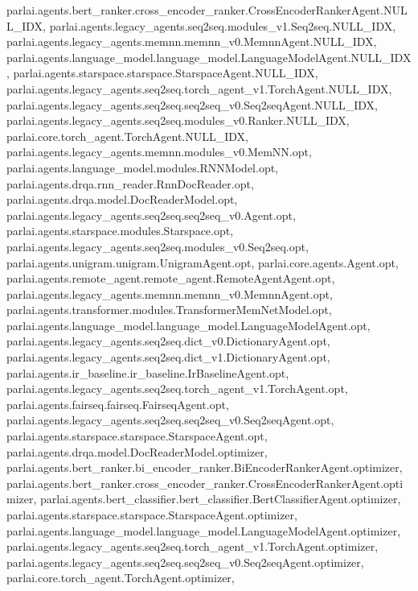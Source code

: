 parlai.\+agents.\+bert\+\_\+ranker.\+cross\+\_\+encoder\+\_\+ranker.\+Cross\+Encoder\+Ranker\+Agent.\+N\+U\+L\+L\+\_\+\+I\+DX, parlai.\+agents.\+legacy\+\_\+agents.\+seq2seq.\+modules\+\_\+v1.\+Seq2seq.\+N\+U\+L\+L\+\_\+\+I\+DX, parlai.\+agents.\+legacy\+\_\+agents.\+memnn.\+memnn\+\_\+v0.\+Memnn\+Agent.\+N\+U\+L\+L\+\_\+\+I\+DX, parlai.\+agents.\+language\+\_\+model.\+language\+\_\+model.\+Language\+Model\+Agent.\+N\+U\+L\+L\+\_\+\+I\+DX, parlai.\+agents.\+starspace.\+starspace.\+Starspace\+Agent.\+N\+U\+L\+L\+\_\+\+I\+DX, parlai.\+agents.\+legacy\+\_\+agents.\+seq2seq.\+torch\+\_\+agent\+\_\+v1.\+Torch\+Agent.\+N\+U\+L\+L\+\_\+\+I\+DX, parlai.\+agents.\+legacy\+\_\+agents.\+seq2seq.\+seq2seq\+\_\+v0.\+Seq2seq\+Agent.\+N\+U\+L\+L\+\_\+\+I\+DX, parlai.\+agents.\+legacy\+\_\+agents.\+seq2seq.\+modules\+\_\+v0.\+Ranker.\+N\+U\+L\+L\+\_\+\+I\+DX, parlai.\+core.\+torch\+\_\+agent.\+Torch\+Agent.\+N\+U\+L\+L\+\_\+\+I\+DX, parlai.\+agents.\+legacy\+\_\+agents.\+memnn.\+modules\+\_\+v0.\+Mem\+N\+N.\+opt, parlai.\+agents.\+language\+\_\+model.\+modules.\+R\+N\+N\+Model.\+opt, parlai.\+agents.\+drqa.\+rnn\+\_\+reader.\+Rnn\+Doc\+Reader.\+opt, parlai.\+agents.\+drqa.\+model.\+Doc\+Reader\+Model.\+opt, parlai.\+agents.\+legacy\+\_\+agents.\+seq2seq.\+seq2seq\+\_\+v0.\+Agent.\+opt, parlai.\+agents.\+starspace.\+modules.\+Starspace.\+opt, parlai.\+agents.\+legacy\+\_\+agents.\+seq2seq.\+modules\+\_\+v0.\+Seq2seq.\+opt, parlai.\+agents.\+unigram.\+unigram.\+Unigram\+Agent.\+opt, parlai.\+core.\+agents.\+Agent.\+opt, parlai.\+agents.\+remote\+\_\+agent.\+remote\+\_\+agent.\+Remote\+Agent\+Agent.\+opt, parlai.\+agents.\+legacy\+\_\+agents.\+memnn.\+memnn\+\_\+v0.\+Memnn\+Agent.\+opt, parlai.\+agents.\+transformer.\+modules.\+Transformer\+Mem\+Net\+Model.\+opt, parlai.\+agents.\+language\+\_\+model.\+language\+\_\+model.\+Language\+Model\+Agent.\+opt, parlai.\+agents.\+legacy\+\_\+agents.\+seq2seq.\+dict\+\_\+v0.\+Dictionary\+Agent.\+opt, parlai.\+agents.\+legacy\+\_\+agents.\+seq2seq.\+dict\+\_\+v1.\+Dictionary\+Agent.\+opt, parlai.\+agents.\+ir\+\_\+baseline.\+ir\+\_\+baseline.\+Ir\+Baseline\+Agent.\+opt, parlai.\+agents.\+legacy\+\_\+agents.\+seq2seq.\+torch\+\_\+agent\+\_\+v1.\+Torch\+Agent.\+opt, parlai.\+agents.\+fairseq.\+fairseq.\+Fairseq\+Agent.\+opt, parlai.\+agents.\+legacy\+\_\+agents.\+seq2seq.\+seq2seq\+\_\+v0.\+Seq2seq\+Agent.\+opt, parlai.\+agents.\+starspace.\+starspace.\+Starspace\+Agent.\+opt, parlai.\+agents.\+drqa.\+model.\+Doc\+Reader\+Model.\+optimizer, parlai.\+agents.\+bert\+\_\+ranker.\+bi\+\_\+encoder\+\_\+ranker.\+Bi\+Encoder\+Ranker\+Agent.\+optimizer, parlai.\+agents.\+bert\+\_\+ranker.\+cross\+\_\+encoder\+\_\+ranker.\+Cross\+Encoder\+Ranker\+Agent.\+optimizer, parlai.\+agents.\+bert\+\_\+classifier.\+bert\+\_\+classifier.\+Bert\+Classifier\+Agent.\+optimizer, parlai.\+agents.\+starspace.\+starspace.\+Starspace\+Agent.\+optimizer, parlai.\+agents.\+language\+\_\+model.\+language\+\_\+model.\+Language\+Model\+Agent.\+optimizer, parlai.\+agents.\+legacy\+\_\+agents.\+seq2seq.\+torch\+\_\+agent\+\_\+v1.\+Torch\+Agent.\+optimizer, parlai.\+agents.\+legacy\+\_\+agents.\+seq2seq.\+seq2seq\+\_\+v0.\+Seq2seq\+Agent.\+optimizer, parlai.\+core.\+torch\+\_\+agent.\+Torch\+Agent.\+optimizer, 